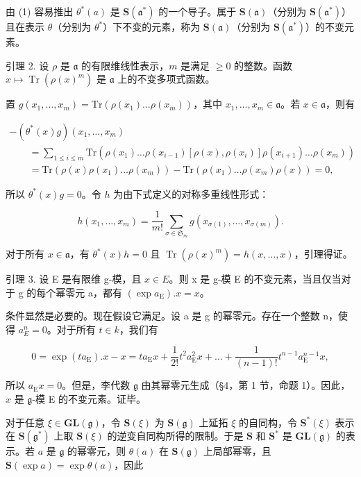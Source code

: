 由 (1) 容易推出 \(\theta^{*}(a)\) 是 \(\mathbf{S}(\mathfrak{a}^{*})\) 的一个导子。属于 \(\mathbf{S}(\mathfrak{a})\)（分别为 \(\mathbf{S}(\mathfrak{a}^{*})\)）且在表示 \(\theta\)（分别为 \(\theta^{*}\)）下不变的元素，称为 \(\mathbf{S}(\mathfrak{a})\)（分别为 \(\mathbf{S}(\mathfrak{a}^{*})\)）的不变元素。

引理 2. 设 \(\rho\) 是 \(\mathfrak{a}\) 的有限维线性表示，\(m\) 是满足 \(\geq 0\) 的整数。函数 \(x \mapsto \operatorname{Tr}(\rho(x)^m)\) 是 \(\mathfrak{a}\) 上的不变多项式函数。

置 \(g(x_{1},\ldots ,x_{m}) = \mathrm{Tr}(\rho (x_{1})\ldots \rho (x_{m}))\)，其中 \(x_{1},\ldots ,x_{m}\in \mathfrak{a}\)。若 \(x\in \mathfrak{a}\)，则有

\[
\begin{array}{l} - (\theta^ {*} (x) g) (x _ {1}, \ldots , x _ {m}) \\ \qquad = \sum_ {1 \leq i \leq m} \mathrm{Tr} (\rho (x _ {1}) \ldots \rho (x _ {i - 1}) [ \rho (x), \rho (x _ {i}) ] \rho (x _ {i + 1}) \ldots \rho (x _ {m})) \\ \qquad = \mathrm{Tr} (\rho (x) \rho (x _ {1}) \ldots \rho (x _ {m})) - \mathrm{Tr} (\rho (x _ {1}) \ldots \rho (x _ {m}) \rho (x)) = 0, \end{array}
\]

所以 \(\theta^{*}(x)g = 0\)。令 \(h\) 为由下式定义的对称多重线性形式：

\[
h (x _ {1}, \dots , x _ {m}) = \frac {1}{m !} \sum_ {\sigma \in \mathfrak {S} _ {m}} g (x _ {\sigma (1)}, \dots , x _ {\sigma (m)}).
\]

对于所有 \(x \in \mathfrak{a}\)，有 \(\theta^{*}(x)h = 0\) 且 \(\operatorname{Tr}(\rho(x)^m) = h(x, \ldots, x)\)，引理得证。

引理 3. 设 E 是有限维 g-模，且 \(x \in E\)。则 x 是 g-模 E 的不变元素，当且仅当对于 g 的每个幂零元 a，都有 \((\exp a_{\mathrm{E}}).x = x\)。

条件显然是必要的。现在假设它满足。设 a 是 g 的幂零元。存在一个整数 n，使得 \(a_{E}^{n}=0\)。对于所有 \(t\in k\)，我们有

\[
0 = \exp (t a _ {\mathrm{E}}). x - x = t a _ {\mathrm{E}} x + \frac {1}{2 !} t ^ {2} a _ {\mathrm{E}} ^ {2} x + \dots + \frac {1}{(n - 1) !} t ^ {n - 1} a _ {\mathrm{E}} ^ {n - 1} x,
\]

所以 \(a_{\mathrm{E}}x = 0\)。但是，李代数 \(\mathfrak{g}\) 由其幂零元生成（§4，第 1 节，命题 1）。因此，\(x\) 是 \(\mathfrak{g}\)-模 E 的不变元素。证毕。

对于任意 \(\xi \in \mathbf{GL}(\mathfrak{g})\)，令 \(\mathbf{S}(\xi)\) 为 \(\mathbf{S}(\mathfrak{g})\) 上延拓 \(\xi\) 的自同构，令 \(\mathbf{S}^*(\xi)\) 表示在 \(\mathbf{S}(\mathfrak{g}^*)\) 上取 \(\mathbf{S}(\xi)\) 的逆变自同构所得的限制。于是 \(\mathbf{S}\) 和 \(\mathbf{S}^*\) 是 \(\mathbf{GL}(\mathfrak{g})\) 的表示。若 \(a\) 是 \(\mathfrak{g}\) 的幂零元，则 \(\theta(a)\) 在 \(\mathbf{S}(\mathfrak{g})\) 上局部幂零，且 \(\mathbf{S}(\exp a) = \exp \theta(a)\)，因此

